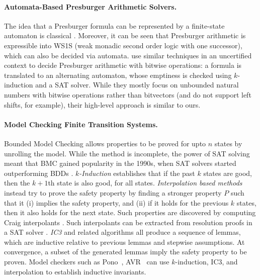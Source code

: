 \paragraph{Automata-Based Presburger Arithmetic Solvers.}
The idea that a Presburger formula can be represented by a finite-state automaton is classical \cite{Büchi1960}.
Moreover, it can be seen that Presburger arithmetic is expressible into WS1S (weak monadic second order logic with one successor),
which can also be decided via automata.
%
\citet{automata-strike-back} use similar techniques in an uncertified context to
decide Presburger arithmetic with bitwise operations: a formula is translated
to an alternating automaton, whose emptiness is checked using $k$-induction and
a SAT solver.
%
While they mostly focus on unbounded natural numbers with bitwise operations
rather than bitvectors (and do not support left shifts, for example), their
high-level approach is similar to ours.

\paragraph{Model Checking Finite Transition Systems.}
Bounded Model Checking allows properties to be proved for upto $n$ states by unrolling the model.
While the method is incomplete, the power of SAT solving meant that BMC gained popularity in the 1990s,
when SAT solvers started outperforming BDDs \cite{biere1999symbolic}.
\emph{$k$-Induction} \cite{sheeran2000checking} establishes that if the past $k$ states are good, then the $k+1$th state is also good,
for all states.
\emph{Interpolation based methods} instead try to prove the safety property
by finding a stronger property $P$ such that it
(i) implies the safety property, and
(ii) if it holds for the previous $k$ states, then it also holds for the next state.
Such properties are discovered by computing Craig interpolants \cite{craig1957linear}.
Such interpolants can be extracted from resolution proofs in a SAT solver \cite{mcmillan2003interpolation}.
\emph{IC3} \cite{bradley2011sat} and related algorithms all produce a sequence of lemmas,
which are inductive relative to previous lemmas and stepwise assumptions.
At convergence, a subset of the generated lemmas imply the safety property to be proven.
Model checkers such as Pono~\cite{mann2021pono}, AVR~\cite{goel2020avr} can use $k$-induction,
IC3, and interpolation to establish inductive invariants.

